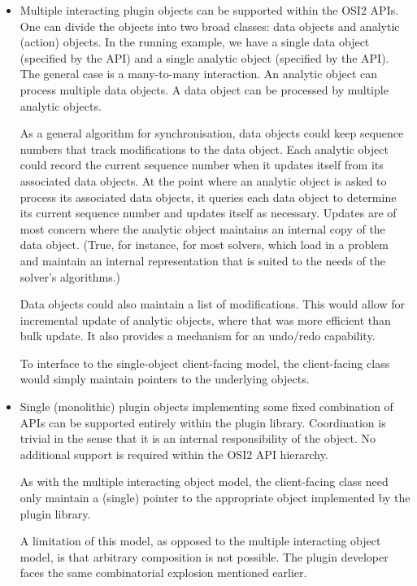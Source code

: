 \documentclass{article}
\newcommand{\OsiTwo}{OSI2\xspace}
\newcommand{\OsiTwoModel}{\pgmid{Osi2::ModelAPI}\xspace}
\newcommand{\OsiTwoSolve}{\pgmid{Osi2::SolveAPI}\xspace}
\begin{document}
\begin{itemize}
  \item
  Multiple interacting plugin objects can be supported within the \OsiTwo APIs.
  One can divide the objects into two broad classes: data objects and analytic
  (action) objects.
  In the running example, we have a single data object (specified by the
  \OsiTwoModel API) and a
  single analytic object (specified by the \OsiTwoSolve API).
  The general case is a many-to-many interaction.
  An analytic object can process multiple data objects.
  A data object can be processed by multiple analytic objects.

  As a general algorithm for synchronisation, data objects could keep sequence
  numbers that track modifications to the data object.
  Each analytic object could record the current sequence number when it
  updates itself from its associated data objects.
  At the point where an analytic object is asked to process its associated
  data objects, it queries each data object to determine its current sequence
  number and updates itself as necessary.
  Updates are of most concern where the analytic object maintains an internal
  copy of the data object.
  (True, for instance, for most solvers, which load in a problem and maintain
  an internal representation that is suited to the needs of the solver's
  algorithms.)

  Data objects could also maintain a list of modifications.
  This would allow for incremental update of analytic objects, where that was
  more efficient than bulk update.
  It also provides a mechanism for an undo/redo capability.

  To interface to the single-object client-facing model, the client-facing class
  would simply maintain pointers to the underlying objects.

  \item
  Single (monolithic) plugin objects implementing some fixed combination of
  APIs can be supported entirely within the plugin library.
  Coordination is trivial in the sense that it is an internal responsibility
  of the object.
  No additional support is required within the \OsiTwo API hierarchy.

  As with the multiple interacting object model, the client-facing class
  need only maintain a (single) pointer to the appropriate object implemented
  by the plugin library.

  A limitation of this model, as opposed to the multiple interacting object
  model, is that arbitrary composition is not possible.
  The plugin developer faces the same combinatorial explosion
  mentioned earlier.


\end{itemize}
\end{document}

